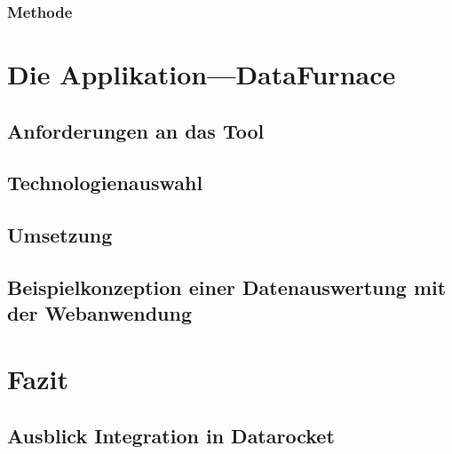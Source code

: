 \documentclass[
  language=german, %
  type=bachelor%
]{isthesis}
\begin{document}
\begin{content}
  \subsection{Methode}


  \chapter{Die Applikation---DataFurnace}
  \section{Anforderungen an das Tool}
  \section{Technologienauswahl}

  \section{Umsetzung}

  \section{Beispielkonzeption einer Datenauswertung mit der Webanwendung}


\chapter{Fazit}
 \section{Ausblick Integration in Datarocket}

  

  

\end{content}



%  
\end{document}
